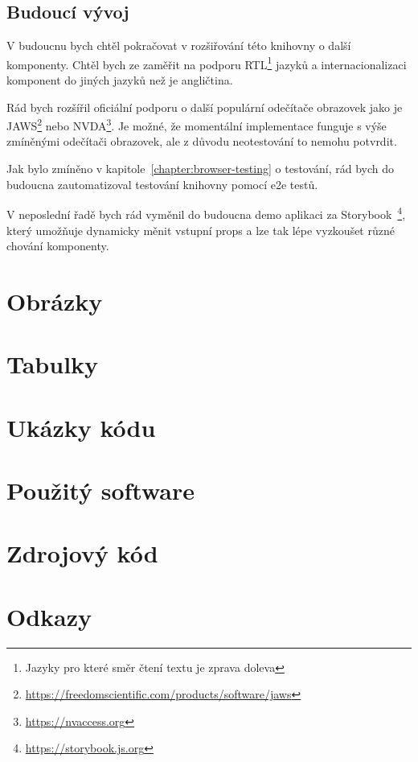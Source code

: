 \documentclass{ctuthesis}
\begin{document}
\section{Budoucí vývoj}

V budoucnu bych chtěl pokračovat v rozšiřování této knihovny o další komponenty.
Chtěl bych ze zaměřit na podporu RTL\footnote{Jazyky pro které směr čtení textu je zprava doleva} jazyků a internacionalizaci komponent do jiných jazyků než je angličtina.

Rád bych rozšířil oficiální podporu o další populární odečítače obrazovek jako je JAWS\footnote{\url{https://freedomscientific.com/products/software/jaws}} nebo NVDA\footnote{\url{https://nvaccess.org}}.
Je možné, že momentální implementace funguje s výše zmíněnými odečítači obrazovek, ale z důvodu neotestování to nemohu potvrdit.

Jak bylo zmíněno v kapitole~\ref{chapter:browser-testing} o testování, rád bych do budoucna zautomatizoval testování knihovny pomocí \gls{e2e} testů.

V neposlední řadě bych rád vyměnil do budoucna demo aplikaci za Storybook~\footnote{\url{https://storybook.js.org}}, který umožňuje dynamicky měnit vstupní props a lze tak lépe vyzkoušet různé chování komponenty.

\appendix

\printbibliography[title={Seznam literatury}]

\chapter{Obrázky}



\chapter{Tabulky}



\chapter{Ukázky kódu}



\chapter{Použitý software}



\chapter{Zdrojový kód}



\chapter{Odkazy}


\end{document}
